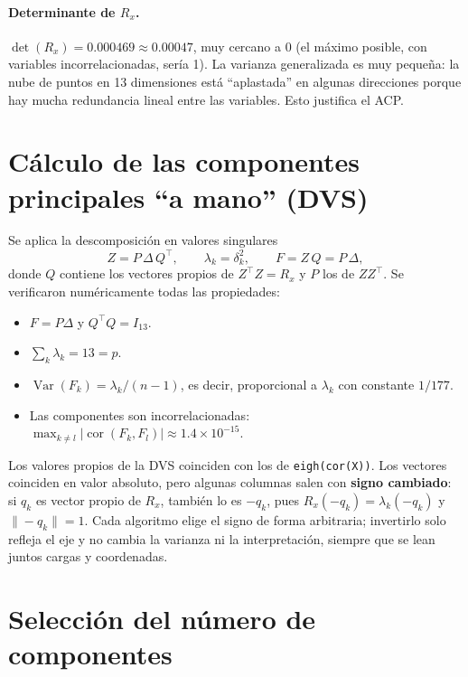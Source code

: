 \documentclass[11pt,a4paper]{article}
\begin{document}
\paragraph{Determinante de $R_x$.} $\det(R_x) = 0.000469 \approx 0.00047$, muy cercano a 0 (el máximo posible, con variables incorrelacionadas, sería 1). La varianza generalizada es muy pequeña: la nube de puntos en 13 dimensiones está ``aplastada'' en algunas direcciones porque hay mucha redundancia lineal entre las variables. Esto justifica el ACP.

\section{Cálculo de las componentes principales ``a mano'' (DVS)}

Se aplica la descomposición en valores singulares
\[
  Z = P\,\Delta\,Q^\top, \qquad \lambda_k = \delta_k^2, \qquad F = Z\,Q = P\,\Delta,
\]
donde $Q$ contiene los vectores propios de $Z^\top Z = R_x$ y $P$ los de $Z Z^\top$. Se verificaron numéricamente todas las propiedades:
\begin{itemize}[leftmargin=*]
  \item $F = P\Delta$ y $Q^\top Q = I_{13}$.
  \item $\sum_k \lambda_k = 13 = p$.
  \item $\operatorname{Var}(F_k) = \lambda_k/(n-1)$, es decir, proporcional a $\lambda_k$ con constante $1/177$.
  \item Las componentes son incorrelacionadas: $\max_{k\neq l}|\operatorname{cor}(F_k,F_l)| \approx 1.4\times10^{-15}$.
\end{itemize}

Los valores propios de la DVS coinciden con los de \texttt{eigh(cor(X))}. Los vectores coinciden en valor absoluto, pero algunas columnas salen con \textbf{signo cambiado}: si $q_k$ es vector propio de $R_x$, también lo es $-q_k$, pues $R_x(-q_k) = \lambda_k(-q_k)$ y $\|-q_k\| = 1$. Cada algoritmo elige el signo de forma arbitraria; invertirlo solo refleja el eje y no cambia la varianza ni la interpretación, siempre que se lean juntos cargas y coordenadas.

\section{Selección del número de componentes}
\end{document}
